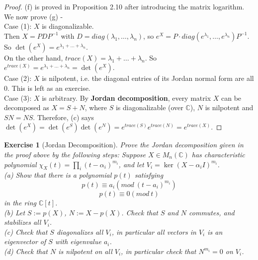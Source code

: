 \documentclass[11pt]{book}
\newtheorem{exercise}[theorem]{Exercise}
\newcommand{\bb}[1]{\mathbb{#1}}
\begin{document}
\begin{proof}
(f) is proved in Proposition 2.10 after introducing the matrix logarithm. We now prove (g) -\\
Case (1): $X$ is diagonalizable.\\
Then $X = PDP^{-1}$ with $D = diag(\lambda_1, \dots, \lambda_n)$, so $e^X = P\cdot diag(e^{\lambda_1}, \dots, e^{\lambda_n}) P^{-1}$. So $\det(e^X) = e^{\lambda_1 + \dots + \lambda_n}$.\\
On the other hand, $trace(X) = \lambda_1 + \dots + \lambda_n$. So $e^{trace(X)} = e^{\lambda_1 + \dots + \lambda_n} = \det(e^X)$.\\
Case (2): $X$ is nilpotent, i.e. the diagonal entries of its Jordan normal form are all $0$. This is left as an exercise.\\
Case (3): $X$ is arbitrary. By \textbf{Jordan decomposition}, every matrix $X$ can be decomposed as $X = S + N$, where $S$ is diagonalizable (over $\bb{C}$), $N$ is nilpotent and $SN = NS$. Therefore, (c) says $\det(e^X) = \det(e^S)\det(e^N) = e^{trace(S)}e^{trace(N)} = e^{trace(X)}$.
\end{proof}

\begin{exercise}[Jordan Decomposition]
Prove the Jordan decomposition given in the proof above by the following steps: Suppose $X \in M_n(\bb{C})$ has characteristic polynomial $\chi_X(t) = \prod_i(t - \alpha_i)^{m_i}$, and let $V_i = \ker (X - \alpha_i I)^{m_i}$.\\
(a) Show that there is a polynomial $p(t)$ satisfying
$$p(t) \equiv a_i (mod\ (t-a_i)^{m_i})$$
$$p(t) \equiv 0 (mod\ t)$$
in the ring $\bb{C}[t]$.\\
(b) Let $S := p(X)$, $N := X - p(X)$. Check that $S$ and $N$ commutes, and stabilizes all $V_i$.\\
(c) Check that $S$ diagonalizes all $V_i$, in particular all vectors in $V_i$ is an eigenvector of $S$ with eigenvalue $a_i$.\\
(d) Check that $N$ is nilpotent on all $V_i$, in particular check that $N^{m_i} = 0$ on $V_i$.
\end{exercise}
\end{document}
